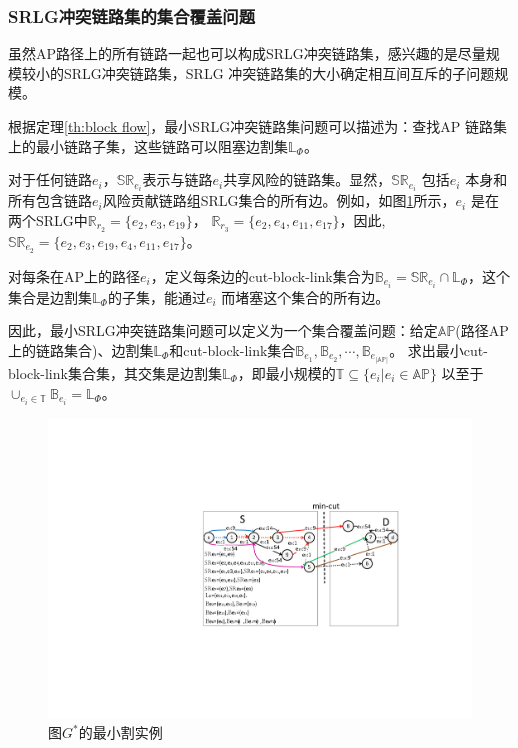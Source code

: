 \subsubsection{SRLG冲突链路集的集合覆盖问题}
\label{subsec:Set cover problem for SRLG Conflicting Link Set}
虽然AP路径上的所有链路一起也可以构成SRLG冲突链路集，感兴趣的是尽量规模较小的SRLG冲突链路集，SRLG 冲突链路集的大小确定相互间互斥的子问题规模。

根据定理\ref{th:block flow}，最小SRLG冲突链路集问题可以描述为：查找AP 链路集上的最小链路子集，这些链路可以阻塞边割集$\mathbb{L}_{\Phi}$。

对于任何链路$e_i$，$\mathbb{SR}_{e_i}$表示与链路$e_i$共享风险的链路集。显然，$\mathbb{SR}_{e_i}$ 包括$e_i$ 本身和所有包含链路$e_i$风险贡献链路组SRLG集合的所有边。例如，如图\ref{fig:MinCutStarGraph}所示，$e_i$ 是在两个SRLG中$\mathbb{R}_{r_2}=\{e_2,e_3,e_{19}\}$， $\mathbb{R}_{r_3}=\{e_2,e_4,e_{11},e_{17}\}$，因此, $\mathbb{SR}_{e_2}=\{e_2,e_3,e_{19},e_4,e_{11},e_{17}\}$。

对每条在AP上的路径$e_i$，定义每条边的cut-block-link集合为${\mathbb{B}_{{e_i}}} = \mathbb{SR}_{{e_i}} \cap \mathbb{L}_{\Phi}$，这个集合是边割集$\mathbb{L}_{\Phi}$的子集，能通过$e_i$ 而堵塞这个集合的所有边。

因此，最小SRLG冲突链路集问题可以定义为一个集合覆盖问题：给定$\mathbb{AP}$(路径AP 上的链路集合)、边割集$\mathbb{L}_{\Phi}$和cut-block-link集合${\mathbb{B}_{{e_1}}},{\mathbb{B}_{{e_2}}}, \cdots ,{\mathbb{B}_{{e_{|\mathbb{AP}|}}}}$。 求出最小cut-block-link集合集，其交集是边割集$\mathbb{L}_{\Phi}$，即最小规模的$\mathbb{T} \subseteq \{e_i| e_i\in \mathbb{AP}\}$ 以至于 ${ \cup_{e_i \in \mathbb{T}}}{\mathbb{B}_{e_i}} = \mathbb{L}_{\Phi}$。


\begin{figure}[htbp]
  \centering
  \includegraphics[width=4.5in]{figures/MinCutStarGraph}
  \caption{图$G^*$的最小割实例}\label{fig:MinCutStarGraph}
  \label{fig:MinCutStarGraph}
\end{figure}


